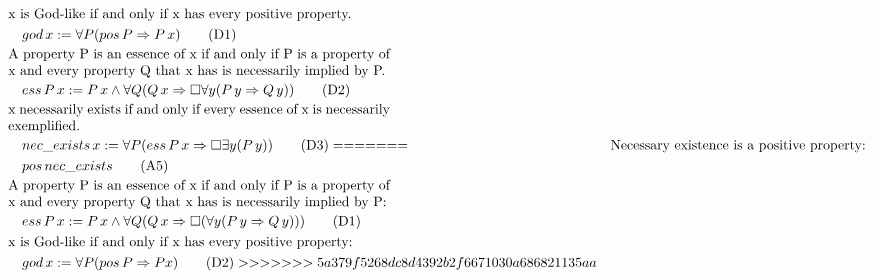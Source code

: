 \documentclass{llncs}
\begin{document}
\begin{align}
& \text{x is God-like if and only if x has every positive property.} \notag \\
& \quad god\,x := \forall P (pos\,P \Rightarrow P\,x) \tag{D1} \\ 
& \parbox[c][2em][c]{0.8\textwidth}{A property P is an essence of x if and only if P is a property of x and every property Q that x has is necessarily implied by P.}\notag \\
& \quad ess\,P\,x := P\,x \wedge \forall Q (Q\,x \Rightarrow \Box \forall y (P\,y \Rightarrow Q\,y)) \tag{D2} \\
& \parbox[c][2em][c]{0.8\textwidth}{x necessarily exists if and only if every essence of x is necessarily exemplified.} \notag \\
& \quad nec\_exists\,x := \forall P (ess\,P\,x \Rightarrow \Box \exists y (P\,y)) \tag{D3} 
=======
& \text{Necessary existence is a positive property:} \notag \\
& \quad pos\,nec\_exists \tag{A5} \\
& \parbox[c][2em][c]{0.8\textwidth}{A property P is an essence of x if and only if P is a property of x and every property Q that x has is necessarily implied by P:}\notag \\
& \quad ess\,P\,x := P\,x \wedge \forall Q (Q\,x \Rightarrow \Box (\forall y (P\,y \Rightarrow Q\,y))) \tag{D1} \\
& \text{x is God-like if and only if x has every positive property:} \notag \\
& \quad god\,x := \forall P (pos\,P \Rightarrow P x) \tag{D2}
>>>>>>> 5a379f5268dc8d4392b2f6671030a686821135aa
\end{align}

      
\end{document}
